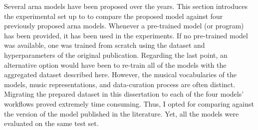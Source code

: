 
Several \gls{arna} models have been proposed over the years.
This section introduces the experimental set up to to
compare the proposed model against four previously proposed
\gls{arna} models. Whenever a pre-trained model (or program)
has been provided, it has been used in the experiments. If
no pre-trained model was available, one was trained from
scratch using the dataset and hyperparameters of the
original publication. Regarding the last point, an
alternative option would have been to re-train all of the
models with the aggregated dataset described here. However,
the musical vocabularies of the models, music
representations, and data-curation process are often
distinct. Migrating the prepared dataset in this
dissertation to each of the four models' workflows proved
extremely time consuming. Thus, I opted for comparing
against the version of the model published in the
literature. Yet, all the models were evaluated on the same
test set.
